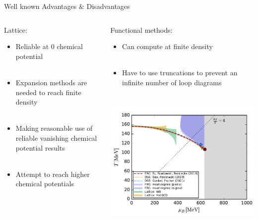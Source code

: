 \begin{frame}[fragile]{Well known Advantages $\&$ Disadvantages}
    \vspace{-0.2cm}
    \begin{columns}
        \begin{column}{0.5\textwidth}
         \vspace{-1.29cm}
         \begin{block}{Lattice:}
            \begin{itemize}
            \item Reliable at 0 chemical potential\\~\
            \item Expansion methods are needed to reach finite density\\~\
            \end{itemize}
         \end{block}
         \vspace{0.8cm}
        \begin{itemize}
        \item Making reasonable use of reliable vanishing chemical potential results\\~\
        \item Attempt to reach higher chemical potentials
        \end{itemize}
        \end{column}
        \begin{column}{0.5\textwidth}
        \begin{block}{Functional methods:}
            \begin{itemize}
            \item Can compute at finite density\\~\
            \item Have to use truncations to prevent an infinite number of loop diagrams \\~\
            \end{itemize}
        \end{block}
        \hspace{0.5cm}
        \includegraphics[width=0.82\linewidth]{Images/Figures/phasestructure_v4.pdf}
        \end{column}
    \end{columns}
\end{frame}
